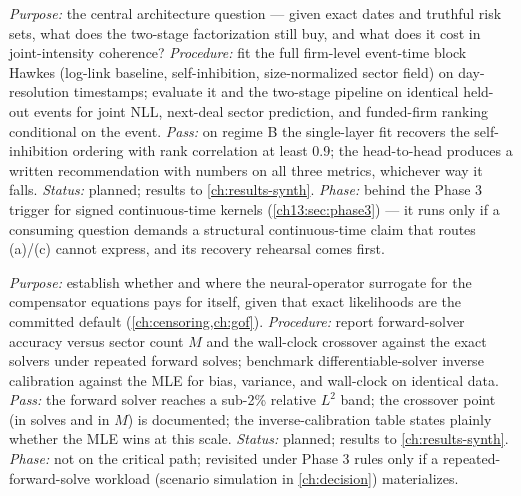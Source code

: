 \begin{protocol}
\label{chcp:prot:e3}
\emph{Purpose:} the central architecture question --- given exact dates and truthful risk sets, what does the
two-stage factorization still buy, and what does it cost in joint-intensity coherence? \emph{Procedure:} fit
the full firm-level event-time block Hawkes (log-link baseline, self-inhibition, size-normalized sector field)
on day-resolution timestamps; evaluate it and the two-stage pipeline on identical held-out events for joint
NLL, next-deal sector prediction, and funded-firm ranking conditional on the event. \emph{Pass:} on regime B
the single-layer fit recovers the self-inhibition ordering with rank correlation at least 0.9; the
head-to-head produces a written recommendation with numbers on all three metrics, whichever way it falls.
\emph{Status:} planned; results to \cref{ch:results-synth}. \emph{Phase:} behind the Phase 3 trigger for
signed continuous-time kernels (\cref{ch13:sec:phase3}) --- it runs only if a consuming question demands a
structural continuous-time claim that routes (a)/(c) cannot express, and its recovery rehearsal comes first.
\end{protocol}

\begin{protocol}
\label{chcp:prot:e4}
\emph{Purpose:} establish whether and where the neural-operator surrogate for the compensator equations pays
for itself, given that exact likelihoods are the committed default (\cref{ch:censoring,ch:gof}).
\emph{Procedure:} report forward-solver accuracy versus sector count $M$ and the wall-clock crossover against
the exact solvers under repeated forward solves; benchmark differentiable-solver inverse calibration against
the MLE for bias, variance, and wall-clock on identical data. \emph{Pass:} the forward solver reaches a
sub-2\% relative $L^2$ band; the crossover point (in solves and in $M$) is documented; the inverse-calibration
table states plainly whether the MLE wins at this scale. \emph{Status:} planned; results to
\cref{ch:results-synth}. \emph{Phase:} not on the critical path; revisited under Phase 3 rules only if a
repeated-forward-solve workload (scenario simulation in \cref{ch:decision}) materializes.
\end{protocol}

